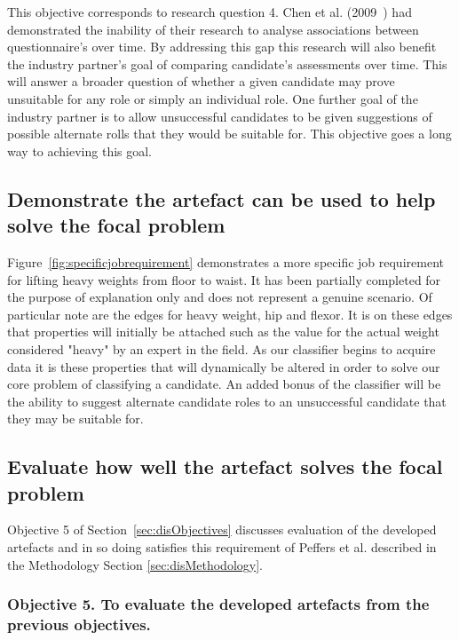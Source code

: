 This objective corresponds to research question 4. Chen et al. (2009~\cite{chen2009mining}) had demonstrated the inability of their research to analyse associations between questionnaire's over time. By addressing this gap this research will also benefit the industry partner's goal of comparing candidate's assessments over time. This will answer a broader question of whether a given candidate may prove unsuitable for any role or simply an individual role. One further goal of the industry partner is to allow unsuccessful candidates to be given suggestions of possible alternate rolls that they would be suitable for. This objective goes a long way to achieving this goal.


\subsection{Demonstrate the artefact can be used to help solve the focal problem}

Figure~\ref{fig:specificjobrequirement} demonstrates a more specific job requirement for lifting heavy weights from floor
to waist. It has been partially completed for the purpose of explanation only and does not represent a genuine scenario.
Of particular note are the edges for heavy weight,
hip and flexor. It is on these edges that properties will initially be attached such as the value for the actual weight
considered "heavy" by an expert in the field. As our classifier begins to acquire data it is these properties that will
dynamically be altered in order to solve our core problem of classifying a candidate. An added bonus of the classifier
will be the ability to suggest alternate candidate roles to an unsuccessful candidate that they may be suitable for.




\subsection{Evaluate how well the artefact solves the focal problem}

Objective 5 of Section~\ref{sec:disObjectives} discusses evaluation of the developed artefacts and in so doing satisfies
this requirement of Peffers et al. described in the Methodology Section \ref{sec:disMethodology}.

\subsubsection{Objective 5. To evaluate the developed artefacts from the previous objectives.}


